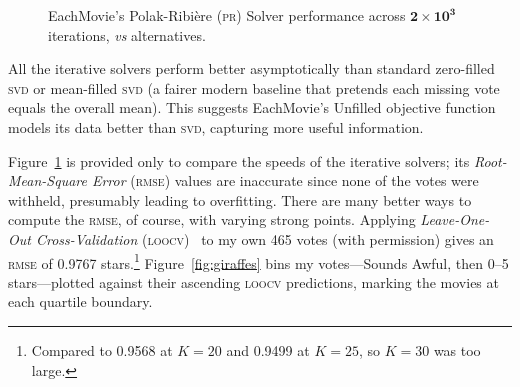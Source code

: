 \documentclass[sigconf,authorversion,screen,microtype={protrusion=true,expansion,kerning,spacing}]{acmart}
\begin{document}
\begin{figure}

\caption{EachMovie's Polak-Ribi{\`e}re (\textsc{pr}) Solver performance across $\bm{2\times{}10^3}$ iterations, \textit{vs} alternatives.}

\label{fig:speeds}
\end{figure}

All the iterative solvers perform better asymptotically than standard zero-filled \textsc{svd} or mean-filled \textsc{svd} (a fairer modern baseline that pretends each missing vote equals the overall mean). This suggests EachMovie's Unfilled objective function models its data better than \textsc{svd}, capturing more useful information.

Figure~\ref{fig:speeds} is provided only to compare the speeds of the iterative solvers; its \textit{Root-Mean-Square Error} \textsc{(rmse)} values are inaccurate since none of the votes were withheld, presumably leading to overfitting. There are many better ways to compute the \textsc{rmse}, of course, with varying strong points. Applying \emph{Leave-One-Out Cross-Validation} (\textsc{loocv})~\cite{Stone1974} to my own 465 votes (with permission) gives an \textsc{rmse} of 0.9767 stars.\footnote{Compared to 0.9568 at $K=20$ and 0.9499 at $K=25$, so $K=30$ was too large.} Figure~\ref{fig:giraffes} bins my votes---Sounds Awful, then 0--5 stars---plotted against their ascending \textsc{loocv} predictions, marking the movies at each quartile boundary.
\end{document}
